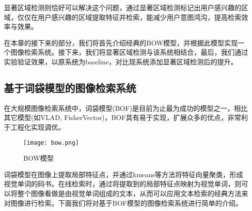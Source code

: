 显著区域检测则恰好可以解决这个问题，通过显著区域检测标记出用户感兴趣的区域，仅仅在用户感兴趣的区域提取特征并检索，能减少用户意图鸿沟，提高检索效率与效果。

在本章的接下来的部分，我们将首先介绍经典的BOW模型，并根据此模型实现一个图像检索系统。接下来，我们将显著区域检测与该系统相结合，最后，我们通过实验验证效果，以原系统为baseline，对比现系统添加显著区域检测后的提升。

\subsection{基于词袋模型的图像检索系统}
在大规模图像检索系统中，词袋模型(BOF)是目前为止最为成功的模型之一\cite{arandjelovic2012three}，相比其它模型(如VLAD\cite{arandjelovic2013all}, FisherVector\cite{perronnin2010large})，BOF具有易于实现，扩展众多的优点，非常利于工程化实现调优。

\begin{figure}
\centering
\texttt{[image: bow.png]}
\caption{BOW模型}
\end{figure}

词袋模型在图像上提取局部特征点，并通过kmeans等方法将特征向量聚类，形成视觉单词的码书。在线检索时，通过将提取到的局部特征点映射为视觉单词，则可以将整个图像看做是由视觉单词组成的文本，从而可以应用文本检索的经典方法来对图像进行检索。下面我们将对基于BOF模型的图像检索系统进行简单的介绍。


